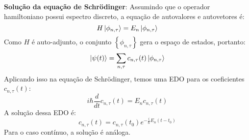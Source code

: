 \documentclass{article}
\begin{document}
	\textbf{Solução da equação de Schrödinger}:
	Assumindo que o operador hamiltoniano possui espectro discreto, a equação de autovalores e autovetores é:
	$$H\ket{\phi_{n,\tau}}=E_{n}\ket{\phi_{n,\tau}}  $$
	Como $H$ é auto-adjunto, o conjunto $\left\{ \phi_{n,\tau} \right\}$ gera o espaço de estados, portanto:
	$$\ket{\psi(t)}=\sum_{n,\tau} c_{n,\tau}(t)\ket{\phi_{n,\tau}}  $$
	Aplicando isso na equação de Schrödinger, temos uma EDO para os coeficientes $c_{n,\tau}(t)$:
	$$i\hbar \frac{d}{dt}c_{n,\tau}(t)=E_{n}c_{n,\tau}(t)$$
	A solução dessa EDO é:
	$$c_{n,\tau}(t)=c_{n,\tau}(t_{0})e^{-\frac{i}{\hbar}E_{n}(t-t_{0})}$$
	Para o caso contínuo, a solução é análoga.
	
\end{document}
